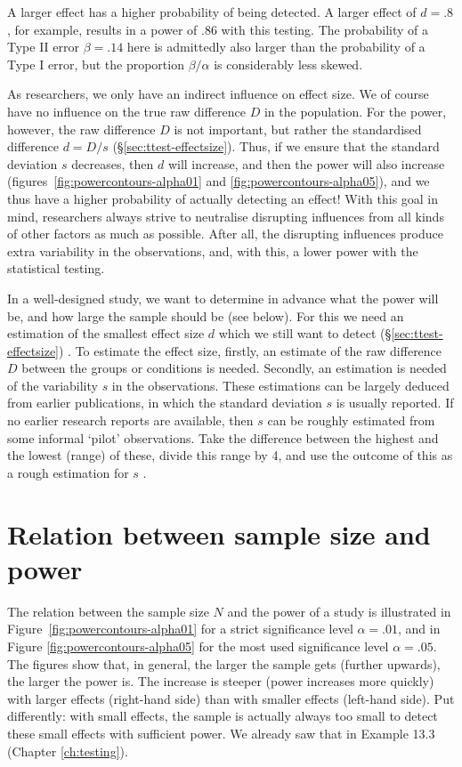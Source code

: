 \documentclass[
]{book}
\begin{document}
A larger effect has a higher probability of being detected. A larger
effect of \(d=.8\), for example, results in a power of
\(.86\) with this testing. The probability of a Type II error \(\beta=.14\) here is
admittedly also larger than the probability of a Type I error, but the
proportion \(\beta/\alpha\) is considerably less skewed.

As researchers, we only have an indirect influence on effect size.
We of course have no influence on the true raw difference \(D\) in the
population. For the power, however, the raw difference \(D\) is not
important, but rather the standardised difference \(d=D/s\)
(§\ref{sec:ttest-effectsize}). Thus, if we ensure that the standard
deviation \(s\) decreases, then \(d\) will increase,
and then the power will also increase
(figures~\ref{fig:powercontours-alpha01} and \ref{fig:powercontours-alpha05}),
and we thus have a higher probability
of actually detecting an effect!
With this goal in mind, researchers always strive to neutralise
disrupting influences from all kinds of other factors as much as possible.
After all, the disrupting influences produce extra variability in the observations, and,
with this, a lower power with the statistical testing.

In a well-designed study, we want to determine in advance what
the power will be, and how large the sample should be (see below).
For this we need an estimation of the smallest effect size \(d\)
which we still want to detect
(§\ref{sec:ttest-effectsize}) \citep{Quene10}. To estimate the effect size, firstly,
an estimate of the raw difference \(D\) between the groups or conditions is needed.
Secondly, an estimation is needed of the variability \(s\)
in the observations. These estimations can be largely deduced from
earlier publications, in which the standard deviation
\(s\) is usually reported. If no earlier research reports are available,
then \(s\) can be roughly estimated from some informal
`pilot' observations. Take the difference between the highest and the lowest
(range) of these, divide this range by 4, and use the outcome of this as
a rough estimation for \(s\) \citep{PD08}.

\hypertarget{sec:samplesize-power}{%
\section{Relation between sample size and power}\label{sec:samplesize-power}}

The relation between the sample size \(N\) and the power of a study
is illustrated in
Figure~\ref{fig:powercontours-alpha01} for a strict significance
level \(\alpha=.01\), and in
Figure \ref{fig:powercontours-alpha05} for the most used
significance level \(\alpha=.05\). The figures show that, in general, the larger the
sample gets (further upwards), the larger the power is.
The increase is steeper (power increases more quickly) with larger
effects (right-hand side) than with smaller effects (left-hand side). Put differently:
with small effects, the sample is actually always too small to detect
these small effects with sufficient power. We already saw that in
Example 13.3 (Chapter \ref{ch:testing}).
\end{document}
